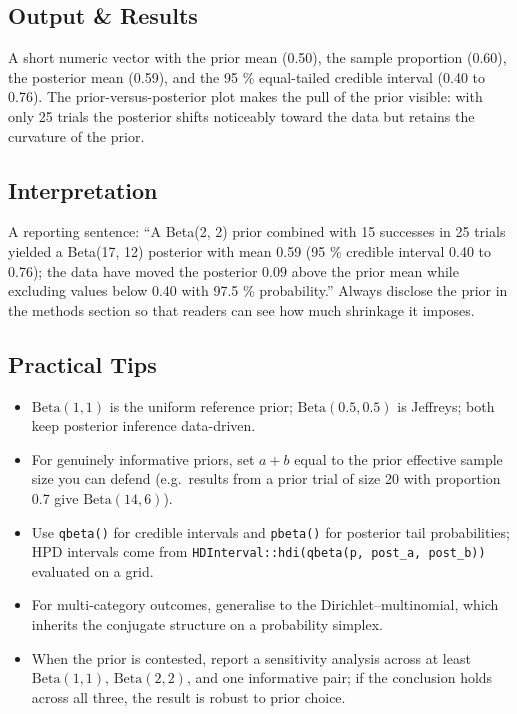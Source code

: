 \documentclass[
]{article}
\providecommand{\tightlist}{%
  \setlength{\itemsep}{0pt}\setlength{\parskip}{0pt}}
\begin{document}
\subsection{Output \& Results}\label{output-results}

A short numeric vector with the prior mean (0.50), the sample proportion
(0.60), the posterior mean (0.59), and the 95 \% equal-tailed credible
interval (0.40 to 0.76). The prior-versus-posterior plot makes the pull
of the prior visible: with only 25 trials the posterior shifts
noticeably toward the data but retains the curvature of the prior.

\subsection{Interpretation}\label{interpretation}

A reporting sentence: ``A Beta(2, 2) prior combined with 15 successes in
25 trials yielded a Beta(17, 12) posterior with mean 0.59 (95 \%
credible interval 0.40 to 0.76); the data have moved the posterior
\(0.09\) above the prior mean while excluding values below 0.40 with
97.5 \% probability.'' Always disclose the prior in the methods section
so that readers can see how much shrinkage it imposes.

\subsection{Practical Tips}\label{practical-tips}

\begin{itemize}
\tightlist
\item
  \(\mathrm{Beta}(1, 1)\) is the uniform reference prior;
  \(\mathrm{Beta}(0.5, 0.5)\) is Jeffreys; both keep posterior inference
  data-driven.
\item
  For genuinely informative priors, set \(a + b\) equal to the prior
  effective sample size you can defend (e.g.~results from a prior trial
  of size 20 with proportion 0.7 give \(\mathrm{Beta}(14, 6)\)).
\item
  Use \texttt{qbeta()} for credible intervals and \texttt{pbeta()} for
  posterior tail probabilities; HPD intervals come from
  \texttt{HDInterval::hdi(qbeta(p,\ post\_a,\ post\_b))} evaluated on a
  grid.
\item
  For multi-category outcomes, generalise to the Dirichlet--multinomial,
  which inherits the conjugate structure on a probability simplex.
\item
  When the prior is contested, report a sensitivity analysis across at
  least \(\mathrm{Beta}(1, 1)\), \(\mathrm{Beta}(2, 2)\), and one
  informative pair; if the conclusion holds across all three, the result
  is robust to prior choice.
\end{itemize}
\end{document}
